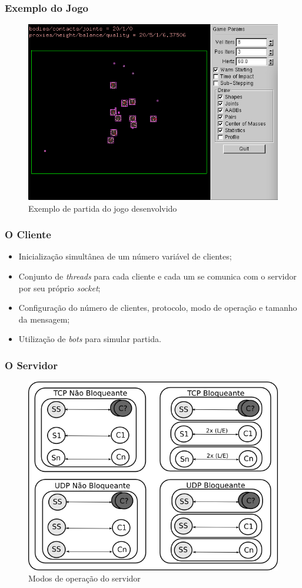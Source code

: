\documentclass{beamer}
\begin{document}
\begin{frame} \frametitle{Exemplo do Jogo}
\begin{figure}[ht]
  \centering
  \includegraphics[width=.7\textwidth]{img/partida.png}
  \caption{Exemplo de partida do jogo desenvolvido}
  \label{fig:partida}
\end{figure}
\end{frame}

\begin{frame} \frametitle{O Cliente}
\begin{itemize}
	\item \justifying Inicialização simultânea de um número variável de clientes;
	\item \justifying Conjunto de \textit{threads} para cada cliente e cada um se comunica com o servidor por seu próprio \textit{socket};
	\item \justifying Configuração do número de clientes, protocolo, modo de operação e tamanho da mensagem;
	\item \justifying Utilização de \emph{bots} para simular partida.
\end{itemize}
\end{frame}

\begin{frame} \frametitle{O Servidor}
\begin{figure}[ht]
  \centering
  \includegraphics[width=.6\textwidth]{img/server.png}
  \caption{Modos de operação do servidor}
  \label{fig:server}
\end{figure}	
\end{frame}
\end{document}
